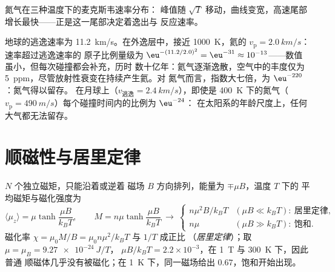 \begin{omfigure}

{\small 氮气在三种温度下的麦克斯韦速率分布：
峰值随 $\sqrt T$ 移动，曲线变宽，高速尾部
增长最快——正是这一尾部决定着逸出与
反应速率。}
\end{omfigure}

\begin{example}[谁逃离行星]\label{ex:b2:boltzmann-factor:escape}
地球的逃逸速率为 \qty{11.2}{km/s}。在外逸层中，接近
\qty{1000}{K}，氦的 $v_{\text{p}} = \qty{2.0}{km/s}$：速率超过逃逸速率的
原子比例量级为 $\eu^{-(11.2/2.0)^2} = \eu^{-31}
\approx 10^{-13}$——数值虽小，但每次碰撞都会补充，历时
数十亿年：氦气逐渐逸散，空气中的丰度仅为
\qty{5}{ppm}，尽管放射性衰变在持续产生氦。对
氮气而言，指数大七倍，为 $\eu^{-220}$：氮气得以留存。
在月球上（$v_{\text{逃逸}} = \qty{2.4}{km/s}$），即使是
\qty{400}{K} 下的氮气（$v_{\text{p}} = \qty{490}{m/s}$）每个碰撞时间内的比例为 $\eu^{-24}$：
在太阳系的年龄尺度上，任何大气都无法留存。
\end{example}

\section{顺磁性与居里定律}

\begin{proposition}[自旋 1/2 顺磁体]\label{prop:b2:boltzmann-factor:curie}
$N$ 个独立磁矩，只能沿着或逆着
磁场 $B$ 方向排列，能量为 $\mp\mu B$，温度 $T$ 下的
平均磁矩与磁化强度为
\[
\langle\mu_z\rangle = \mu\tanh\frac{\mu B}{k_BT}, \qquad
M = n\mu\tanh\frac{\mu B}{k_BT}
\ \longrightarrow\
\begin{cases} n\mu^2B/k_BT & (\mu B \ll k_BT):\ \text{居里定律}, \\ n\mu & (\mu B \gg k_BT):\ \text{饱和}. \end{cases}
\]
磁化率 $\chi = \mu_0M/B = \mu_0n\mu^2/k_BT$ 与 $1/T$ 成正比
（\emph{居里定律}）；取 $\mu = \mu_B = \qty{9.27e-24}{J/T}$，
$\mu B/k_BT = 2.2 \times 10^{-3}$，在 \qty{1}{T} 与 \qty{300}{K} 下，因此普通
顺磁体几乎没有被磁化；在 \qty{1}{K} 下，同一磁场给出
$0.67$，饱和开始出现。
\end{proposition}

